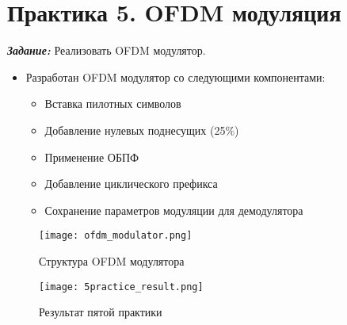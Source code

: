 \chapter*{Практика 5. OFDM модуляция}
\label{ch:5_practice}

\textit{\textbf{Задание:}} Реализовать OFDM модулятор.

\begin{itemize}
    \item Разработан OFDM модулятор со следующими компонентами:
    \begin{itemize}
        \item Вставка пилотных символов
        \item Добавление нулевых поднесущих (25\%)
        \item Применение ОБПФ
        \item Добавление циклического префикса
        \item Сохранение параметров модуляции для демодулятора
    \end{itemize}
\end{itemize}

\begin{figure}[ht]
    \centering
    \texttt{[image: ofdm\_modulator.png]}
    \caption{Структура OFDM модулятора}
    \label{fig:ofdm_modulator}
\end{figure}

\begin{figure}[ht]
    \centering
    \texttt{[image: 5practice\_result.png]}
    \caption{Результат пятой практики}
    \label{fig:5practice_result}
\end{figure}